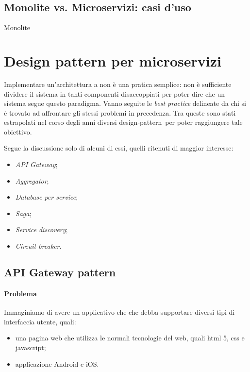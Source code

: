 \subsection{Monolite vs. Microservizi: casi d'uso}
Monolite


\section{Design pattern per microservizi}

Implementare un'architettura a  non è una pratica semplice: non è sufficiente dividere il sistema in tanti componenti disaccoppiati per poter dire che un sistema segue questo paradigma.
Vanno seguite le \textit{best practice} delineate da chi si è trovato ad affrontare gli stessi problemi in precedenza.
Tra queste sono stati estrapolati nel corso degli anni diversi \gls{design-pattern}\gloss\ per poter raggiungere tale obiettivo.

Segue la discussione solo di alcuni di essi, quelli ritenuti di maggior interesse:

\begin{itemize}
	\item \textit{API Gateway};
	\item \textit{Aggregator};

	\item \textit{Database per service};
	\item \textit{Saga};

	\item \textit{Service discovery};
	\item \textit{Circuit breaker}.
\end{itemize}


\subsection{API Gateway pattern}\label{api-gateway}

\paragraph*{Problema} Immaginiamo di avere un applicativo che  che debba supportare diversi tipi di interfaccia utente, quali: 
\begin{itemize}[noitemsep]
	\item una pagina web che utilizza le normali tecnologie del web, quali \acrshort{html} 5, \acrshort{css} e \gls{javascript};
	\item applicazione Android e iOS.
\end{itemize}

